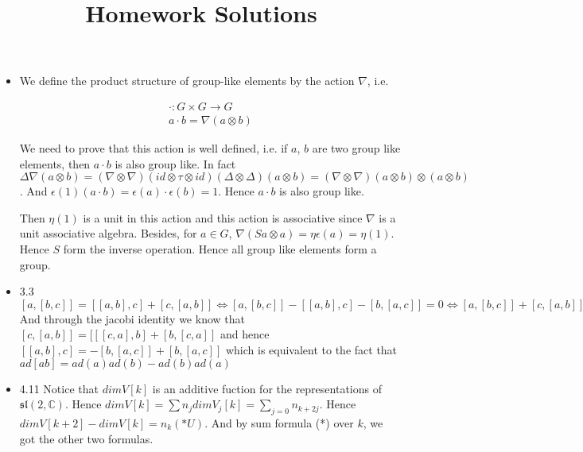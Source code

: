 \documentclass[10pt,letterpaper]{article}
\makeatletter
\newcommand{\C}{\mathbb{C}}
\newcommand\course[1]{\renewcommand\@course{#1}}
\newcommand\@course{}
\newcommand\term[1]{\renewcommand\@term{#1}}
\newcommand\@term{}
\theoremstyle{plain}
\theoremstyle{definition}
\theoremstyle{remark}
\makeatother
\begin{document}
\course{}
\term{}
\title{Homework  Solutions}
\author{}
\maketitle
\begin{itemize}
\item We define the product structure of group-like elements by the action $\nabla$, i.e. 

\begin{align*}
\cdot : G\times G \to  G \\
a \cdot b= \nabla (a \otimes b)
\end{align*}


We need to prove that this action is well defined, i.e. if $a$, $b$ are two  group like elements, then $a\cdot b$ is also group like. In fact $\Delta\nabla(a\otimes b)=(\nabla\otimes\nabla)(id\otimes \tau \otimes id)(\Delta \otimes \Delta) (a \otimes b)=(\nabla \otimes \nabla) (a\otimes b) \otimes (a \otimes b)$. And $\epsilon (1) (a\cdot b)= \epsilon(a)\cdot \epsilon(b)=1$. Hence $a\cdot b$ is also group like.

Then $\eta(1)$ is a unit in this action and this action is associative since $\nabla$ is a unit associative algebra. Besides, for $a \in G$, $\nabla (Sa \otimes a)= \eta\epsilon(a)=\eta(1) $. Hence $S$ form the inverse operation. Hence all group like elements form a group.

\item 3.3
$[a,[b,c]]= [[a,b],c]+ [c,[a,b]] \Leftrightarrow [a,[b,c]]-[[a,b],c]-[b,[a,c]]=0 \Leftrightarrow [a,[b,c]]+[c,[a,b]]+[b,[c,a]]=0 $ And through the jacobi identity we know that $[c,[a,b]]= [[[c,a],b]+[b,[c,a]]$ and hence $[[a,b],c]=-[b,[a,c]]+[b,[a,c]]$ which is equivalent to the fact that $ad[ab]=ad(a)ad(b)-ad(b)ad(a)$

\item 4.11
Notice that $dim V[k]$ is an additive fuction for the representations of $\mathfrak{sl}(2,\C)$. Hence $dim V[k]=\sum n_{j}dim V_{j}[k]=\sum_{j=0}n_{k+2j}$. Hence $dim V[k+2]-dim V[k]=n_{k} (*U)$. And by sum formula (*) over $k$, we got the other two formulas.

\end{itemize} 
\end{document}
